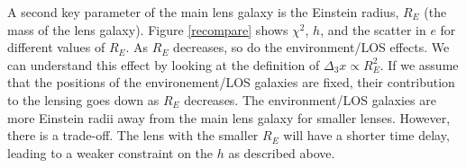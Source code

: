 A second key parameter of the main lens galaxy is the Einstein radius, $R_E$ (the mass of the lens galaxy). Figure \ref{recompare} shows $\chi^2$, $h$, and the scatter in $e$ for different values of $R_E$. As $R_E$ decreases, so do the environment/LOS effects. We can understand this effect by looking at the definition of $\Delta_3 x \propto R_E^2$. If we assume that the positions of the environement/LOS galaxies are fixed, their contribution to the lensing goes down as $R_E$ decreases. The environment/LOS galaxies are more Einstein radii away from the main lens galaxy for smaller lenses. However, there is a trade-off. The lens with the smaller $R_E$ will have a shorter time delay, leading to a weaker constraint on the $h$ as described above.